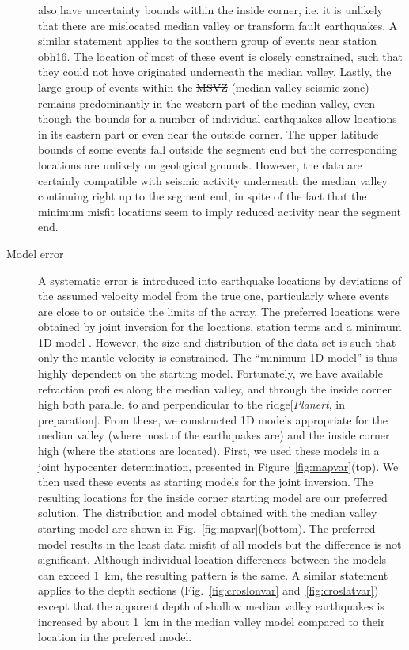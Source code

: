 \documentclass[jgr]{agu2001}
\newlength{\tw}
\providecommand{\DIFadd}[1]{{\protect\color{blue}\uwave{#1}}} %
\providecommand{\DIFdel}[1]{{\protect\color{red}\sout{#1}}}                      %
\providecommand{\DIFaddbegin}{} %
\providecommand{\DIFaddend}{} %
\providecommand{\DIFdelbegin}{} %
\providecommand{\DIFdelend}{} %
\begin{document}
\begin{article}
\begin{description}
also have uncertainty bounds within the inside corner, i.e. it is unlikely
that there are mislocated median valley or transform fault
earthquakes.  A similar statement applies to the southern group of
events near station obh16.  The location of most of these event is
closely constrained, such that they could not have originated underneath
the median valley.   Lastly, the large group of events within the \DIFdelbegin \DIFdel{MSVZ
}\DIFdelend \DIFaddbegin \DIFadd{MVSZ
}\DIFaddend (median valley seismic zone) remains predominantly in the western part of the median
valley, even though the bounds for a number of individual earthquakes
allow locations in its eastern part or even near the outside corner.
The upper latitude bounds of
some events fall outside the segment end but the corresponding locations are
unlikely on geological grounds.  However, the data are certainly
compatible with seismic activity underneath the
median valley continuing right up to the segment end, in spite of the
fact that the minimum misfit locations seem to imply reduced activity
near the segment end. 

\item[Model error]
A systematic error is introduced into earthquake locations by
deviations of the assumed velocity model from the true one, particularly where
events are close to or outside the limits of the array.  The preferred
locations were obtained by joint inversion for the locations,
station terms and a minimum 1D-model \citep[using
VELEST][]{kissling94}. However, the size and distribution of the data
set is such that only the mantle velocity is constrained.
The ``minimum 1D model'' is thus highly dependent on the starting
model.  Fortunately, we have available refraction profiles along the median
valley, and through the inside corner high both parallel to and
perpendicular to the ridge[{\it Planert},
in preparation].  From these, we constructed 1D models appropriate for
the median valley (where most of the earthquakes are) and the inside
corner high (where the stations are located).  First, we used these
models in a joint hypocenter determination, presented in Figure~\ref{fig:mapvar}(top).
We then used these
events as starting models for the joint inversion. The resulting
locations for the inside corner starting model are our preferred
solution. The distribution and model obtained with the median valley
starting model are shown in Fig.~\ref{fig:mapvar}(bottom).  The
preferred model results in the least data misfit of all models but the
difference is not significant.  Although individual location
differences between the models can exceed 1~km, the resulting pattern
is the same.  A similar statement applies to the depth sections
(Fig.~\ref{fig:croslonvar} and~\ref{fig:croslatvar}) except that the
apparent depth of shallow median valley earthquakes is 
increased by about 1~km in the median valley model compared to their
location in the preferred model.


\end{description}
\end{article}
\end{document}
